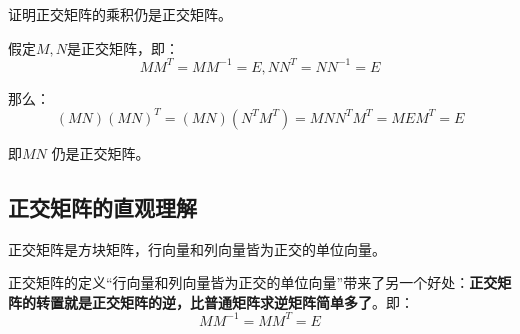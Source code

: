 \documentclass[12pt]{article}
\begin{document}
\begin{framed}  
\small{
证明正交矩阵的乘积仍是正交矩阵。

假定$M,N$是正交矩阵，即：
$$
MM^T = MM^{-1} = E, NN^T = NN^{-1} = E
$$

那么：
$$
(MN)(MN)^T = (MN)(N^TM^T) = MNN^TM^T = MEM^T = E
$$

即$MN$ 仍是正交矩阵。
}
\end{framed}

\subsection{正交矩阵的直观理解}
正交矩阵是方块矩阵，行向量和列向量皆为正交的单位向量。

正交矩阵的定义“行向量和列向量皆为正交的单位向量”带来了另一个好处：\textbf{正交矩阵的转置就是正交矩阵的逆，比普通矩阵求逆矩阵简单多了}。即：
$$
MM^{-1} = MM^T = E
$$
\end{document}
